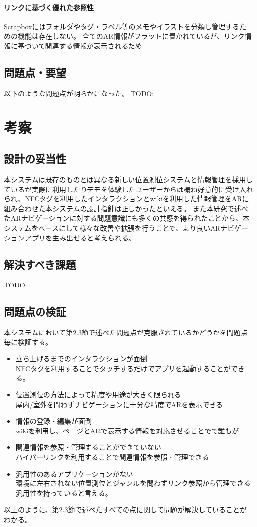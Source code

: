 \paragraph*{リンクに基づく優れた参照性}
Scrapboxにはフォルダやタグ・ラベル等のメモやイラストを分類し管理するための機能は存在しない。
全てのAR情報がフラットに置かれているが、リンク情報に基づいて関連する情報が表示されるため



\subsection{問題点・要望}
以下のような問題点が明らかになった。
TODO:


\section{考察}

\subsection{設計の妥当性}
本システムは既存のものとは異なる新しい位置測位システムと情報管理を採用しているが実際に利用したりデモを体験したユーザーからは概ね好意的に受け入れられ、NFCタグを利用したインタラクションとwikiを利用した情報管理をARに組み合わせた本システムの設計指針は正しかったといえる。
また本研究で述べたARナビゲーションに対する問題意識にも多くの共感を得られたことから、本システムをベースにして様々な改善や拡張を行うことで、より良いARナビゲーションアプリを生み出せると考えられる。

\subsection{解決すべき課題}
TODO:

\subsection{問題点の検証}
本システムにおいて第2.3節で述べた問題点が克服されているかどうかを問題点毎に検証する。
\begin{itemize}
  \item 立ち上げるまでのインタラクションが面倒 \\
  NFCタグを利用することでタッチするだけでアプリを起動することができる。
  \item 位置測位の方法によって精度や用途が大きく限られる \\
  屋内/室外を問わずナビゲーションに十分な精度でARを表示できる
  \item 情報の登録・編集が面倒 \\
  wikiを利用し、ページとARで表示する情報を対応させることでで誰もが
  \item 関連情報を参照・管理することができていない \\
  ハイパーリンクを利用することで関連情報を参照・管理できる
  \item 汎用性のあるアプリケーションがない \\
  環境に左右されない位置測位とジャンルを問わずリンク参照から管理できる汎用性を持っていると言える。
\end{itemize}
以上のように、第2.3節で述べたすべての点に関して問題が解決していることがわかる。